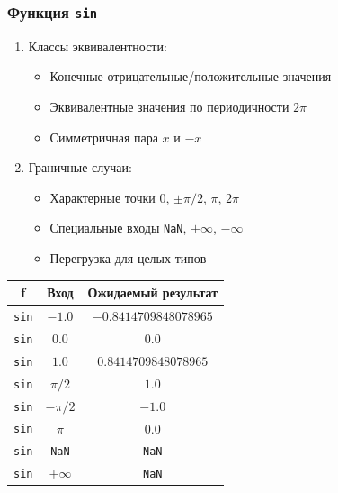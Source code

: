 \documentclass[12pt,a4paper]{report}
\begin{document}
\subsubsection*{Функция \texttt{sin}}
\begin{enumerate}
    \item Классы эквивалентности:
          \begin{itemize}
              \item Конечные отрицательные/положительные значения
              \item Эквивалентные значения по периодичности $2\pi$
              \item Симметричная пара $x$ и $-x$
          \end{itemize}
    \item Граничные случаи:
          \begin{itemize}
              \item Характерные точки $0$, $\pm\pi/2$, $\pi$, $2\pi$
              \item Специальные входы \texttt{NaN}, $+\infty$, $-\infty$
              \item Перегрузка для целых типов
          \end{itemize}
\end{enumerate}
\begin{center}
    \begin{tabular}{|c|c|c|}
        \hline
        \textbf{f} & \textbf{Вход} & \textbf{Ожидаемый результат} \\
        \hline
        \texttt{sin} & $-1.0$ & $-0.8414709848078965$ \\
        \hline
        \texttt{sin} & $0.0$ & $0.0$ \\
        \hline
        \texttt{sin} & $1.0$ & $0.8414709848078965$ \\
        \hline
        \texttt{sin} & $\pi/2$ & $1.0$ \\
        \hline
        \texttt{sin} & $-\pi/2$ & $-1.0$ \\
        \hline
        \texttt{sin} & $\pi$ & $0.0$ \\
        \hline
        \texttt{sin} & \texttt{NaN} & \texttt{NaN} \\
        \hline
        \texttt{sin} & $+\infty$ & \texttt{NaN} \\
        \hline
    \end{tabular}
\end{center}
\end{document}
